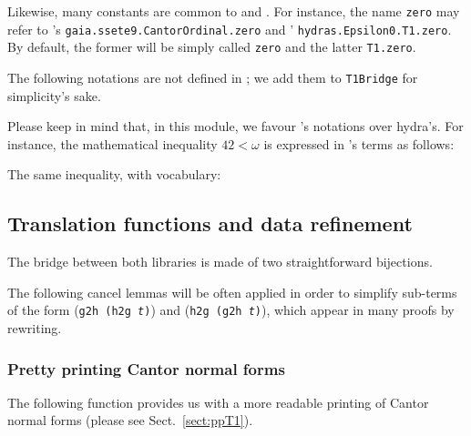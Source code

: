
Likewise, many constants are common to \HydrasLib and \gaia. For instance, the name \texttt{zero} may refer to \gaia's
\texttt{gaia.ssete9.CantorOrdinal.zero}  and
\HydrasLib' \texttt{hydras.Epsilon0.T1.zero}. By default, the former will be simply called \texttt{zero} and the latter \texttt{T1.zero}.



The following notations are not defined in \gaia; we add them to \texttt{T1Bridge} for simplicity's sake.



\begin{remark}
Please keep in mind that, in this module, we favour \gaia's notations over hydra's.
For instance, the mathematical inequality $42<\omega$ is 
expressed in \gaia's terms as follows:


The same inequality, with \HydrasLib vocabulary:

\end{remark}


\subsection{Translation functions and data refinement}

The bridge between both libraries is made of two straightforward bijections.



The following cancel lemmas will be often applied in order to simplify sub-terms of the form (\texttt{g2h (h2g {\it t})}) and (\texttt{h2g (g2h {\it t})}), which appear in many proofs by rewriting.




\subsubsection{Pretty printing Cantor normal forms}
\label{sect:gaia-ppT1}



The following function provides us with a more readable  printing of Cantor normal forms (please see Sect.~\vref{sect:ppT1}).

